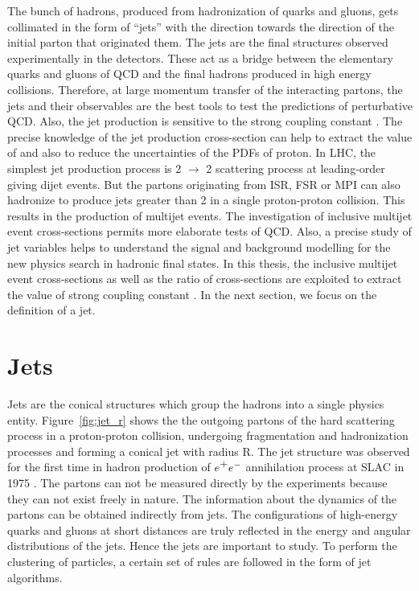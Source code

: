 The bunch of hadrons, produced from hadronization of quarks and gluons, gets collimated in the form of ``jets'' with the direction towards the direction of the initial parton that originated them. The jets are the final structures observed experimentally in the detectors. These act as a bridge between the elementary quarks and gluons of QCD and the final hadrons produced in high energy collisions. Therefore, at large momentum transfer of the interacting partons, the jets and their observables are the best tools to test the predictions of perturbative QCD. Also, the jet production is sensitive to the strong coupling constant \alpsns. The precise knowledge of the jet production cross-section can help to extract the value of \alps and also to reduce the uncertainties of the PDFs of proton. In LHC, the simplest jet production process is 2 $\rightarrow$ 2 scattering process at leading-order giving dijet events. But the partons originating from ISR, FSR or MPI can also hadronize to produce jets greater than 2 in a single proton-proton collision. This results in the production of multijet events. The investigation of inclusive multijet event cross-sections permits more elaborate tests of QCD. Also, a precise study of jet variables helps to understand the signal and background modelling for the new physics search in hadronic final states. In this thesis, the inclusive multijet event cross-sections as well as the ratio of cross-sections are exploited to extract the value of strong coupling constant \alps. In the next section, we focus on the definition of a jet.
\section{Jets}
\label{sec:jets}
Jets \cite{Sterman:1977wj} are the conical structures which group the hadrons into a single physics entity. Figure~\ref{fig:jet_r} shows the the outgoing partons of the hard scattering process in a proton-proton collision, undergoing fragmentation and hadronization processes and forming a conical jet with radius R. The jet structure was observed for the first time in hadron production of $e^\plusn e^-$ annihilation process at SLAC in 1975 \cite{Hanson:1975fe}. The partons can not be measured directly by the experiments because they can not exist freely in nature. The information about the dynamics of the partons can be obtained indirectly from jets. The configurations of high-energy quarks and gluons at short distances are truly reflected in the energy and angular distributions of the jets. Hence the jets are important to study. To perform the clustering of particles, a certain set of rules are followed in the form of jet algorithms. 

